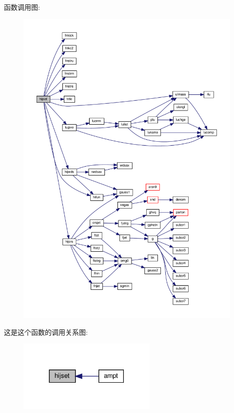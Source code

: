 函数调用图\+:
\nopagebreak
\begin{figure}[H]
\begin{center}
\leavevmode
\includegraphics[width=350pt]{hijset_8f90_a5b6edaf42645e73a502c3b60ce32d536_cgraph}
\end{center}
\end{figure}
这是这个函数的调用关系图\+:
\nopagebreak
\begin{figure}[H]
\begin{center}
\leavevmode
\includegraphics[width=194pt]{hijset_8f90_a5b6edaf42645e73a502c3b60ce32d536_icgraph}
\end{center}
\end{figure}
